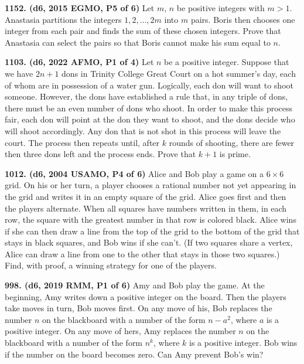 \documentclass{article}
\begin{document}
        \textbf{1152. (\color{red}d6\color{black}, 2015 EGMO, P5 of 6)} Let $m$, $n$ be positive integers with $m > 1$. Anastasia partitions the integers $1, 2, \dots , 2m$ into $m$ pairs. Boris then chooses one integer from each pair and finds the sum of these chosen integers.
        Prove that Anastasia can select the pairs so that Boris cannot make his sum equal to $n$.

        \textbf{1103. (\color{red}d6\color{black}, 2022 AFMO, P1 of 4)} Let $n$ be a positive integer. Suppose that we have $2n+1$ dons in Trinity College Great Court on a hot summer's day, each of whom are in possession of a water gun. Logically, each don will want to shoot someone. However, the dons have established a rule that, in any triple of dons, there must be an even number of dons who shoot. In order to make this process fair, each don will point at the don they want to shoot, and the dons decide who will shoot accordingly. Any don that is not shot in this process will leave the court. The process then repeats until, after $k$ rounds of shooting, there are fewer then three dons left and the process ends. Prove that $k+1$ is prime.

        \textbf{1012. (\color{red}d6\color{black}, 2004 USAMO, P4 of 6)} Alice and Bob play a game on a $6 \times 6$ grid.  On his or her turn, a player chooses a rational number not yet appearing in the grid and writes it in an empty square of the grid. Alice goes first and then the players alternate. When all squares have numbers written in them, in each row, the square with the greatest number in that row is colored black. Alice wins if she can then draw a line from the top of the grid to the bottom of the grid that stays in black squares, and Bob wins if she can't.  (If two squares share a vertex, Alice can draw a line from one to the other that stays in those two squares.)  Find, with proof, a winning strategy for one of the players.

        \textbf{998. (\color{red}d6\color{black}, 2019 RMM, P1 of 6)} Amy and Bob play the game. At the beginning, Amy writes down a positive integer on the board. Then the players take moves in turn, Bob moves first. On any move of his, Bob replaces the number $n$ on the blackboard with a number of the form $n-a^2$, where $a$ is a positive integer. On any move of hers, Amy replaces the number $n$ on the blackboard with a number of the form $n^k$, where $k$ is a positive integer. Bob wins if the number on the board becomes zero. \newline
        \newline
        Can Amy prevent Bob's win?
\end{document}
